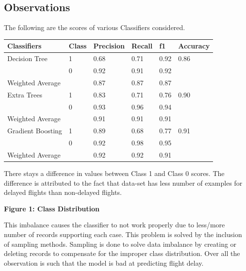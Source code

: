 \documentclass{article}
\begin{document}
\subsection{Observations}

The following are the scores of various Classifiers considered.
\begin{center}
 \label{tab:title} 
\begin{tabular}{ |p{2cm}|p{1cm}|p{2cm}|p{1cm}|p{1cm}|p{2cm}| }
 \hline
 Classifiers & Class & Precision & Recall & f1 & Accuracy\\
 \hline
 Decision Tree & 1  & 0.68 & 0.71 & 0.92 & 0.86 \\
               & 0  & 0.92 & 0.91 & 0.92 &  \\
\hline
 Weighted Average & & 0.87 & 0.87 & 0.87 &  \\
 \hline
 \hline
 Extra Trees   & 1  & 0.83 & 0.71 & 0.76 & 0.90 \\
               & 0  & 0.93 & 0.96 & 0.94 & \\
\hline
 Weighted Average & & 0.91 & 0.91 & 0.91 & \\
 \hline
 \hline
 Gradient Boosting           & 1  & 0.89 & 0.68 & 0.77 & 0.91\\
               & 0  & 0.92 & 0.98 & 0.95 & \\
\hline
 Weighted Average & & 0.92 & 0.92 & 0.91 & \\
 \hline
\end{tabular}
\end{center}

There stays a difference in values between Class 1 and Class 0 scores. The difference is attributed to the fact that data-set has less number of examples for delayed flights than non-delayed flights.

\begin{center}
\end{center}

\begin{center}
\textbf{Figure 1: Class Distribution}
\end{center}

This imbalance causes the classifier to not work properly due to less/more number of records supporting each case. This problem is solved by the inclusion of sampling methods. Sampling is done to solve data imbalance by creating or deleting records to compensate for the improper class distribution. Over all the observation is such that the model is bad at predicting flight delay. 
\end{document}
